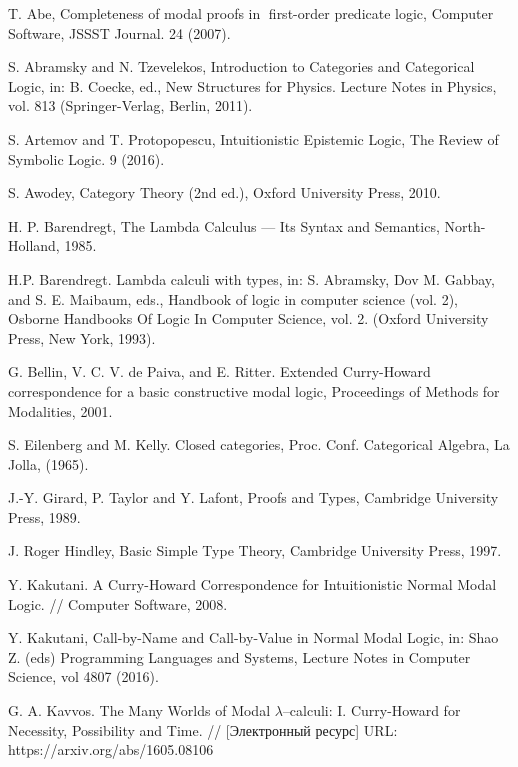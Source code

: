 \documentclass[a4paper]{article}
\begin{document}
  \begin{thebibliography}{}

   T. Abe, Completeness of modal proofs in first-order predicate logic, Computer Software, JSSST Journal. 24 (2007).

   S. Abramsky and N. Tzevelekos, Introduction to Categories and Categorical Logic, in: B. Coecke, ed., New Structures for Physics.
  Lecture Notes in Physics, vol. 813 (Springer-Verlag, Berlin, 2011).

   S. Artemov and T. Protopopescu, Intuitionistic Epistemic Logic, The
  Review of Symbolic Logic. 9 (2016).

   S. Awodey, Category Theory (2nd ed.), Oxford University Press, 2010.

   H. P. Barendregt, The Lambda Calculus --- Its Syntax and Semantics, North-Holland, 1985.

   H.P. Barendregt. Lambda calculi with types, in: S. Abramsky, Dov M. Gabbay, and S. E.
  Maibaum, eds., Handbook of logic in computer science (vol. 2), Osborne Handbooks Of Logic In Computer
  Science, vol. 2. (Oxford University Press, New York, 1993).

   G. Bellin, V. C. V. de Paiva, and E. Ritter. Extended Curry-Howard correspondence for a basic constructive modal logic, Proceedings of Methods for Modalities, 2001.

   S. Eilenberg and M. Kelly. Closed categories, Proc. Conf. Categorical Algebra, La Jolla, (1965).

   J.-Y. Girard, P. Taylor and Y. Lafont, Proofs and Types, Cambridge University
  Press, 1989.

   J. Roger Hindley, Basic Simple Type Theory, Cambridge University Press, 1997.

   Y. Kakutani. A Curry-Howard Correspondence for Intuitionistic Normal Modal Logic. // Computer Software, 2008.

   Y. Kakutani, Call-by-Name and Call-by-Value in Normal Modal Logic, in: Shao Z. (eds)
  Programming Languages and Systems, Lecture Notes in Computer Science, vol 4807 (2016).

   G. A. Kavvos. The Many Worlds of Modal $\lambda$--calculi: I. Curry-Howard for Necessity, Possibility and Time. // [Электронный ресурс] URL: https://arxiv.org/abs/1605.08106


\end{thebibliography}
\end{document}

